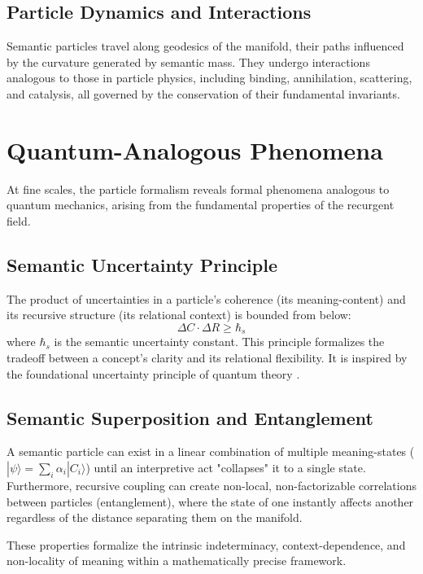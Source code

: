 \subsection{Particle Dynamics and Interactions}
\label{sec:particle_dynamics_and_interactions}

Semantic particles travel along geodesics of the manifold, their paths influenced by the curvature generated by semantic mass. They undergo interactions analogous to those in particle physics, including binding, annihilation, scattering, and catalysis, all governed by the conservation of their fundamental invariants.


\section{Quantum-Analogous Phenomena}
\label{sec:quantum_analogous_phenomena}

At fine scales, the particle formalism reveals formal phenomena analogous to quantum mechanics, arising from the fundamental properties of the recurgent field.


\subsection{Semantic Uncertainty Principle}
\label{sec:semantic_uncertainty_principle}

The product of uncertainties in a particle's coherence (its meaning-content) and its recursive structure (its relational context) is bounded from below:
\begin{equation}
\Delta C \cdot \Delta R \geq \hbar_s
\end{equation}
where \(\hbar_s\) is the semantic uncertainty constant. This principle formalizes the tradeoff between a concept's clarity and its relational flexibility. It is inspired by the foundational uncertainty principle of quantum theory \autocite{Heisenberg1927, WheelerZurek1983}.


\subsection{Semantic Superposition and Entanglement}
\label{sec:semantic_superposition_and_entanglement}

A semantic particle can exist in a linear combination of multiple meaning-states (\(|\psi\rangle = \sum_i \alpha_i |C_i\rangle\)) until an interpretive act "collapses" it to a single state. Furthermore, recursive coupling can create non-local, non-factorizable correlations between particles (entanglement), where the state of one instantly affects another regardless of the distance separating them on the manifold.

These properties formalize the intrinsic indeterminacy, context-dependence, and non-locality of meaning within a mathematically precise framework. 